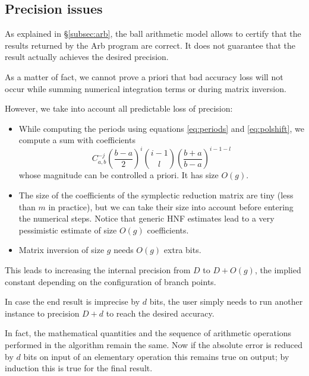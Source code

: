 \documentclass[main.tex]{subfiles}
\begin{document}
   \subsection{Precision issues}

   As explained in \S \ref{subsec:arb}, the ball arithmetic model allows
   to certify that the results returned by the Arb program \cite{Johansson2013arb} are correct.
   It does not guarantee that the result actually achieves the desired
   precision.

   As a matter of fact, we cannot prove a priori that bad accuracy loss
   will not occur while summing numerical integration terms or
   during matrix inversion.

   However, we take into account all predictable loss of precision:
   \begin{itemize}
       \item While computing the periods using equations \eqref{eq:periods}
           and \eqref{eq:polshift}, we compute a sum with coefficients
           \begin{equation*}
               C_{a,b}^{-j} \left(\frac{b-a}{2}\right)^i
               {i-1 \choose l} \left(\frac{b+a}{b-a}\right)^{i-1-l}
           \end{equation*}
           whose magnitude can be controlled a priori. It has size $O(g)$.
       \item The size of the coefficients of the symplectic reduction
           matrix are tiny (less than $m$ in practice), but we can take
           their size into account before entering the numerical steps.
           Notice that generic HNF estimates lead to a very pessimistic
           estimate of size $O(g)$ coefficients.
       \item Matrix inversion of size $g$ needs $O(g)$ extra bits.
   \end{itemize}
   This leads to increasing the internal precision from $D$ to $D + O(g)$,
   the implied constant depending on the configuration of branch points.

   \begin{rmk}
   In case the end result is imprecise by $d$ bits, the user simply needs to
   run another instance to precision $D+d$ to reach the desired accuracy.

   In fact, the mathematical quantities and the sequence of arithmetic
   operations performed in the algorithm remain the same. Now
   if the absolute error is reduced by $d$ bits on input of an elementary
   operation this remains true on output; by induction this is true for
   the final result.
   \end{rmk}
\end{document}
